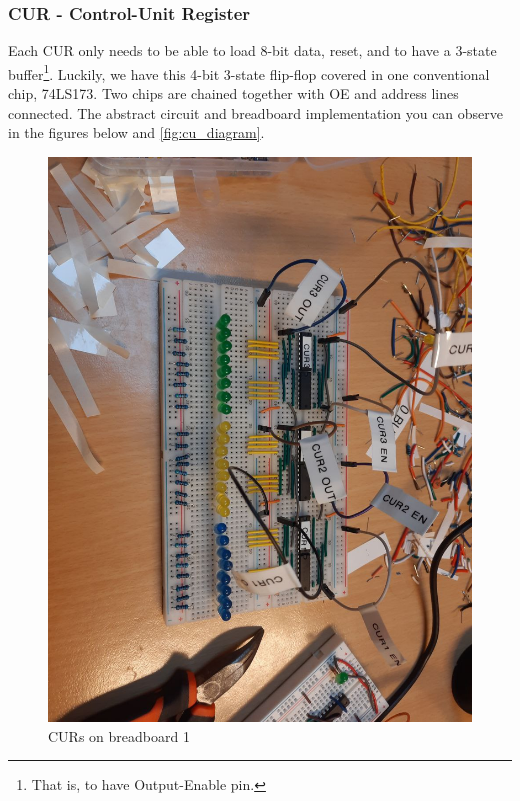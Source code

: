 \subsubsection{CUR - Control-Unit Register} \label{sec:implementation:control_unit:cur}
Each CUR only needs to be able to load 8-bit data, reset, and to have a 3-state buffer\footnote{That is, to have Output-Enable pin.}. Luckily, we have this 4-bit 3-state flip-flop covered in one conventional chip, 74LS173. Two chips are chained together with OE and address lines connected. The abstract circuit and breadboard implementation you can observe in the figures below and \ref{fig:cu_diagram}.


\begin{figure}[H]
	\centering
	\begin{minipage}[b]{0.4\textwidth}
		\includegraphics[width=\textwidth]{img/progress/8}
		\caption{CURs on breadboard 1}
	\end{minipage}
	\hfill
	\begin{minipage}[b]{0.4\textwidth}

\end{minipage}
\end{figure}

